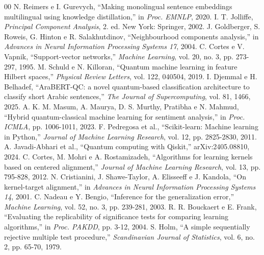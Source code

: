 \documentclass[conference]{IEEEtran}
\begin{document}
\begin{thebibliography}{00}
 N. Reimers e I. Gurevych, ``Making monolingual sentence embeddings multilingual using knowledge distillation,'' in \textit{Proc. EMNLP}, 2020.
 I. T. Jolliffe, \textit{Principal Component Analysis}, 2. ed. New York: Springer, 2002.
 J. Goldberger, S. Roweis, G. Hinton e R. Salakhutdinov, ``Neighbourhood components analysis,'' in \textit{Advances in Neural Information Processing Systems 17}, 2004.
 C. Cortes e V. Vapnik, ``Support-vector networks,'' \textit{Machine Learning}, vol. 20, no. 3, pp. 273-297, 1995.
 M. Schuld e N. Killoran, ``Quantum machine learning in feature Hilbert spaces,'' \textit{Physical Review Letters}, vol. 122, 040504, 2019.
 I. Djemmal e H. Belhadef, ``AraBERT-QC: a novel quantum-based classification architecture to classify short Arabic sentences,'' \textit{The Journal of Supercomputing}, vol. 81, 1466, 2025.
 A. K. M. Masum, A. Maurya, D. S. Murthy, Pratibha e N. Mahmud, ``Hybrid quantum-classical machine learning for sentiment analysis,'' in \textit{Proc. ICMLA}, pp. 1006-1011, 2023.
 F. Pedregosa et al., ``Scikit-learn: Machine learning in Python,'' \textit{Journal of Machine Learning Research}, vol. 12, pp. 2825-2830, 2011.
 A. Javadi-Abhari et al., ``Quantum computing with Qiskit,'' arXiv:2405.08810, 2024.
 C. Cortes, M. Mohri e A. Rostamizadeh, ``Algorithms for learning kernels based on centered alignment,'' \textit{Journal of Machine Learning Research}, vol. 13, pp. 795-828, 2012.
 N. Cristianini, J. Shawe-Taylor, A. Elisseeff e J. Kandola, ``On kernel-target alignment,'' in \textit{Advances in Neural Information Processing Systems 14}, 2001.
 C. Nadeau e Y. Bengio, ``Inference for the generalization error,'' \textit{Machine Learning}, vol. 52, no. 3, pp. 239-281, 2003.
 R. R. Bouckaert e E. Frank, ``Evaluating the replicability of significance tests for comparing learning algorithms,'' in \textit{Proc. PAKDD}, pp. 3-12, 2004.
 S. Holm, ``A simple sequentially rejective multiple test procedure,'' \textit{Scandinavian Journal of Statistics}, vol. 6, no. 2, pp. 65-70, 1979.
\end{thebibliography}
\end{document}
